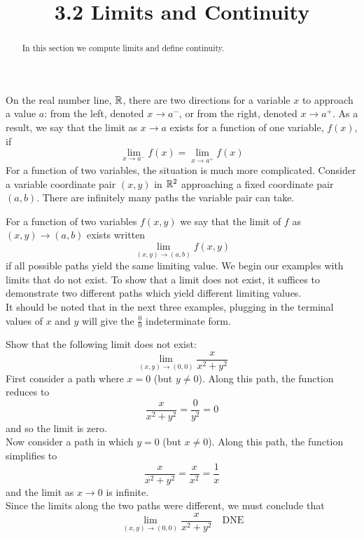 \documentclass[handout]{ximera}
\title{3.2 Limits and Continuity}
\begin{document}
\begin{abstract}
In this section we compute limits and define continuity.
\end{abstract}

\maketitle

On the real number line, $\mathbb R$, there are two directions for a variable $x$ to approach a value $a$: from 
the left, denoted $x \to a^-$, or from the right, denoted $x \to a^+$.
As a result, we say that the limit as $x \to a$ exists for a function of one variable, $f(x)$, if
\[
\lim_{x \to a^-} f(x) = \lim_{x \to a^+} f(x)
\]
For a function of two variables, the situation is much more complicated. 
Consider a variable coordinate pair $(x, y)$ in $\mathbb R^2$
approaching a fixed coordinate pair $(a,b)$.  There are infinitely many paths the variable pair can take.

\begin{image}
\end{image} 

For a function of two variables $f(x,y)$ we say that the 
limit of $f$ as $(x, y) \to (a,b)$ exists written
\[
\lim_{(x,y) \to (a,b)} f(x,y)
\]
if all possible paths yield the same limiting value. 
We begin our examples with limits that do not exist. 
To show that a limit does not exist, it suffices to demonstrate 
two different paths which yield different limiting values.\\
It should be noted that in the next three examples, 
plugging in the terminal values of $x$ and $y$ will 
give the $\frac00$ indeterminate form.

\begin{example}[Example 1]
Show that the following limit does not exist:
\[
\lim_{(x,y) \to (0,0)} \frac{x}{x^2 + y^2}
\]
First consider a path where $x = 0$ (but $y \neq 0$). Along this path, the function reduces to
\[
\frac{x}{x^2 + y^2} = \frac{0}{y^2} = 0
\]
and so the limit is zero.\\
Now consider a path in which $y = 0$ (but $x \neq 0$). Along this path, the function simplifies to
\[
\frac{x}{x^2 + y^2} = \frac{x}{x^2} = \frac{1}{x}
\]
and the limit as $x \to 0$ is infinite.\\
Since the limits along the two paths were different, we must conclude that
\[
\lim_{(x,y) \to (0,0)} \frac{x}{x^2 + y^2} \quad \text{DNE}
\]
\end{example}
\end{document}

